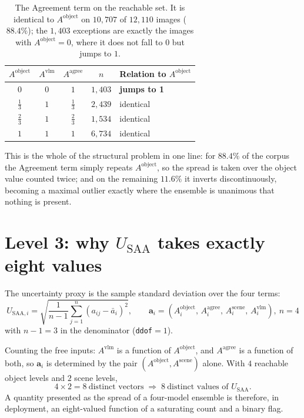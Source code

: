 \documentclass[12pt,a4paper]{report}
\begin{document}
\begin{table}[!htbp]
\centering
\caption[The Agreement term on the reachable set]{The Agreement term on the reachable set. It is identical to $A^{\text{object}}$ on $10{,}707$ of $12{,}110$ images ($88.4\%$); the $1{,}403$ exceptions are exactly the images with $A^{\text{object}}=0$, where it does not fall to $0$ but jumps to $1$.}
\label{tab:agree_reduction}
\small
\begin{tabular}{ccccl}
\toprule
$A^{\text{object}}$ & $A^{\text{vlm}}$ & $A^{\text{agree}}$ & $n$ & Relation to $A^{\text{object}}$ \\
\midrule
$0$            & $0$ & $1$            & $1{,}403$ & \textbf{jumps to 1} \\
$\tfrac13$     & $1$ & $\tfrac13$     & $2{,}439$ & identical \\
$\tfrac23$     & $1$ & $\tfrac23$     & $1{,}534$ & identical \\
$1$            & $1$ & $1$            & $6{,}734$ & identical \\
\bottomrule
\end{tabular}
\end{table}

This is the whole of the structural problem in one line: for $88.4\%$ of the corpus the Agreement term simply repeats $A^{\text{object}}$, so the spread is taken over the object value counted twice; and on the remaining $11.6\%$ it inverts discontinuously, becoming a maximal outlier exactly where the ensemble is unanimous that nothing is present.

\section{Level 3: why $U_{\text{SAA}}$ takes exactly eight values}

The uncertainty proxy is the sample standard deviation over the four terms:
\begin{equation}
U_{\text{SAA},i} = \sqrt{\frac{1}{n-1}\sum_{j=1}^{n}\left(a_{ij}-\bar{a}_i\right)^2},
\qquad
\mathbf{a}_i = \left(A_i^{\text{object}},\, A_i^{\text{agree}},\, A_i^{\text{scene}},\, A_i^{\text{vlm}}\right),
\ n=4
\label{eq:d-usaa}
\end{equation}
with $n-1=3$ in the denominator (\texttt{ddof}$=1$).

Counting the free inputs: $A^{\text{vlm}}$ is a function of $A^{\text{object}}$, and $A^{\text{agree}}$ is a function of both, so $\mathbf{a}_i$ is determined by the pair $(A^{\text{object}}, A^{\text{scene}})$ alone. With $4$ reachable object levels and $2$ scene levels,
\[
4 \times 2 = 8 \ \text{distinct vectors} \;\Longrightarrow\; 8 \ \text{distinct values of } U_{\text{SAA}}.
\]
A quantity presented as the spread of a four-model ensemble is therefore, in deployment, an eight-valued function of a saturating count and a binary flag.
\end{document}

